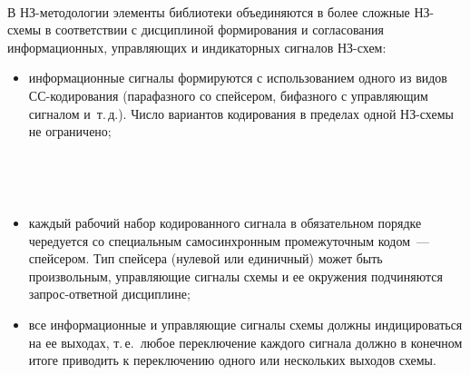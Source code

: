 \begin{multicols}{2}
\begin{figure*} %
             \vspace*{1pt}
 \begin{center}
 \mbox{%
 \epsfxsize=115.162mm
 }
 \end{center}
\end{figure*}

\addtocounter{figure}{1}
       
       В НЗ-методологии элементы библиотеки объединя\-ются в более сложные НЗ-схе\-мы 
в соответствии с дисциплиной формирования и согласования информационных, 
       управ\-ля\-ющих и индикаторных сигналов НЗ-схем:
       \begin{itemize}
\item информационные сигналы формируются с использованием одного из видов 
СС-ко\-ди\-ро\-ва\-ния (парафазного со спейсером, бифазного с управляющим 
сигналом и~т.\,д.). Число вариантов кодирования в пределах одной НЗ-схе\-мы не 
ограничено;
\begin{figure*}[b] %
             \vspace*{6pt}
 \begin{center}
 \mbox{%
 \epsfxsize=145.954mm
 }
 \end{center}
 \vspace*{-6pt}
             \vspace*{6pt}
 \begin{center}
 \mbox{%
 \epsfxsize=148.65mm
 }
 \end{center}
 \vspace*{-9pt}
\end{figure*}
\item каждый рабочий набор кодированного сигнала в обязательном порядке чередуется со 
специальным самосинхронным промежуточным кодом~--- спейсером. Тип спейсера 
(нулевой или единичный) может быть произвольным, управ\-ля\-ющие сигналы схемы и ее 
окружения подчиняются запрос-от\-вет\-ной дисциплине;
\item все информационные и управляющие сиг\-на\-лы схемы должны индицироваться на ее 
выходах, т.\,е.\ любое переключение каждого сигнала должно в конечном итоге приводить 
к переключе\-нию одного или нескольких выходов \mbox{схемы}.
\end{itemize}
 





\end{multicols}
